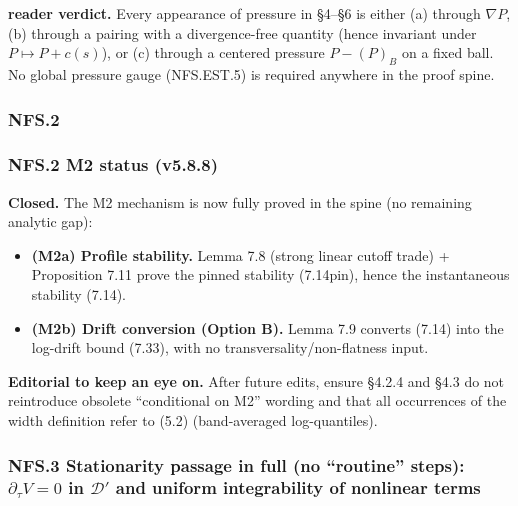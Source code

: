 \documentclass[
  11pt,
]{article}
\providecommand{\tightlist}{%
  \setlength{\itemsep}{0pt}\setlength{\parskip}{0pt}}
\begin{document}
\textbf{reader verdict.} Every appearance of pressure in §4--§6 is either (a) through \(\nabla P\), (b) through a pairing with a divergence-free quantity (hence invariant under \(P\mapsto P+c(s)\)), or (c) through a centered pressure \(P-(P)_B\) on a fixed ball. No global pressure gauge (NFS.EST.5) is required anywhere in the proof spine.

\hypertarget{nfs.2}{%
\subsubsection{NFS.2}\label{nfs.2}}

\hypertarget{nfs.2-m2-status-v5.8.8}{%
\subsubsection{NFS.2 M2 status (v5.8.8)}\label{nfs.2-m2-status-v5.8.8}}

\textbf{Closed.} The M2 mechanism is now fully proved in the spine (no remaining analytic gap):

\begin{itemize}
\tightlist
\item
  \textbf{(M2a) Profile stability.} Lemma 7.8 (strong linear cutoff trade) + Proposition 7.11 prove the pinned stability (7.14pin), hence the instantaneous stability (7.14).
\item
  \textbf{(M2b) Drift conversion (Option B).} Lemma 7.9 converts (7.14) into the log-drift bound (7.33), with no transversality/non-flatness input.
\end{itemize}

\textbf{Editorial to keep an eye on.} After future edits, ensure §4.2.4 and §4.3 do not reintroduce obsolete ``conditional on M2'' wording and that all occurrences of the width definition refer to (5.2) (band-averaged log-quantiles).

\hypertarget{nfs.3-stationarity-passage-in-full-no-routine-steps-partial_tau-v0-in-mathcal-d-and-uniform-integrability-of-nonlinear-terms}{%
\subsubsection{\texorpdfstring{NFS.3 Stationarity passage in full (no ``routine'' steps): \(\partial_\tau V=0\) in \(\mathcal D'\) and uniform integrability of nonlinear terms}{NFS.3 Stationarity passage in full (no ``routine'' steps): \textbackslash partial\_\textbackslash tau V=0 in \textbackslash mathcal D' and uniform integrability of nonlinear terms}}\label{nfs.3-stationarity-passage-in-full-no-routine-steps-partial_tau-v0-in-mathcal-d-and-uniform-integrability-of-nonlinear-terms}}
\end{document}

